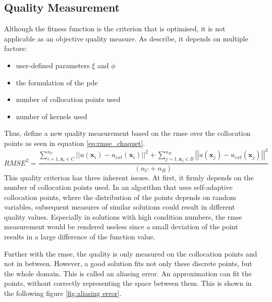 \documentclass[./\jobname.tex]{subfiles}
\begin{document}
\subsection{Quality Measurement}
\label{chap:metric_quality}
Although the fitness function is the criterion that is optimised, it is not applicable as an objective quality measure. As \cite{chaquet_using_2019} describe, it depends on multiple factors:
\begin{itemize}
	\item user-defined parameters $\xi$ and $\phi$ 
	\item the formulation of the \gls{pde} 
	\item number of collocation points used 
	\item number of kernels used
\end{itemize}
Thus, \cite{chaquet_using_2019} define a new quality measurement based on the \gls{rmse} over the collocation points as seen in equation \eqref{eq:rmse_chaquet}. 
\begin{equation}
\label{eq:rmse_chaquet}
RMSE^2 = \frac{\sum_{i=1, \mathbf{x}_i \in C}^{n_C} \left|\left| u(\mathbf{x}_i) - u_{ext}(\mathbf{x}_i) \right|\right|^2 + \sum_{j=1, \mathbf{x}_j \in B}^{n_B} \left|\left| u(\mathbf{x}_j) - u_{ext}(\mathbf{x}_j) \right|\right|^2}{(n_C + n_B)}
\end{equation}
This quality criterion has three inherent issues. At first, it firmly depends on the number of collocation points used. In an algorithm that uses self-adaptive collocation points, where the distribution of the points depends on random variables, subsequent measures of similar solutions could result in different quality values. Especially in solutions with high condition numbers, the \gls{rmse} measurement would be rendered useless since a small deviation of the point results in a large difference of the function value. 

Further with the \gls{rmse}, the quality is only measured on the collocation points and not in between. However, a good solution fits not only these discrete points, but the whole domain. This is called an aliasing error. An approximation can fit the points, without correctly representing the space between them. This is shown in the following figure \ref{fig:aliasing error}.
\end{document}
